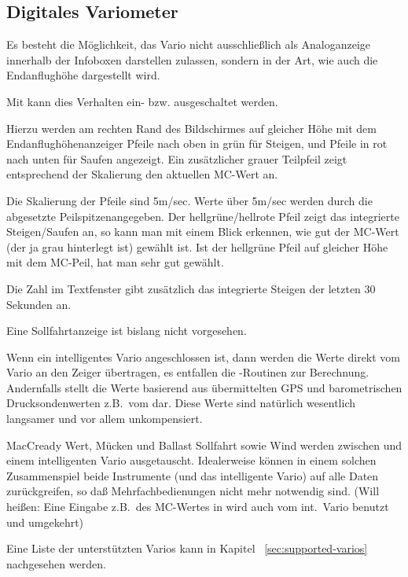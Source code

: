 \subsection*{Digitales Variometer}
Es besteht die Möglichkeit, das Vario nicht ausschließlich als Analoganzeige innerhalb der
Infoboxen darstellen zulassen,
sondern in der Art, wie auch die Endanflughöhe dargestellt wird.


Mit  kann dies Verhalten ein- bzw. ausgeschaltet werden.

Hierzu werden am rechten Rand des Bildschirmes auf gleicher Höhe mit dem Endanflughöhenanzeiger
Pfeile nach oben in grün für Steigen, und Pfeile in rot nach unten für Saufen angezeigt.
Ein zusätzlicher grauer Teilpfeil zeigt entsprechend der Skalierung den aktuellen MC-Wert an.

Die Skalierung der Pfeile sind 5m/sec. Werte über 5m/sec werden durch die abgesetzte Peilspitzenangegeben. 
Der hellgrüne/hellrote  Pfeil zeigt das integrierte Steigen/Saufen  an, so kann man mit einem Blick erkennen, wie gut der MC-Wert (der ja grau hinterlegt ist) gewählt ist. Ist der hellgrüne Pfeil auf gleicher Höhe mit dem MC-Peil, hat man sehr gut gewählt.

Die Zahl im  Textfenster gibt zusätzlich das integrierte Steigen der letzten 30 Sekunden an.

\warning Eine Sollfahrtanzeige  ist bislang nicht vorgesehen.



Wenn ein intelligentes Vario angeschlossen ist, dann werden die Werte direkt vom Vario an den Zeiger
übertragen, es entfallen die \xc-Routinen zur Berechnung. Andernfalls stellt  \xc die Werte basierend aus
übermittelten GPS und barometrischen Drucksondenwerten z.B.\ vom \fl dar. Diese Werte sind natürlich wesentlich
langsamer und vor allem unkompensiert.

MacCready Wert, Mücken und Ballast Sollfahrt sowie Wind werden zwischen  \xc und einem
intelligenten Vario ausgetauscht. Idealerweise können in einem solchen Zusammenspiel beide Instrumente (\xc und das intelligente Vario) auf alle Daten zurückgreifen, so daß Mehrfachbedienungen nicht mehr notwendig sind.
(Will heißen: Eine Eingabe z.B.\ des MC-Wertes in  \xc wird auch vom int.\ Vario benutzt und umgekehrt)

Eine Liste der unterstützten Varios kann in Kapitel  ~\ref{sec:supported-varios} nachgesehen werden.

